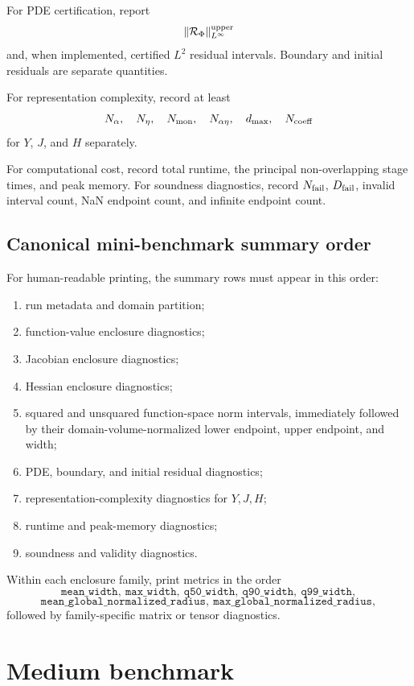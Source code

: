 \documentclass[11pt]{article}
\begin{document}
For PDE certification, report
\[
 \|\mathcal R_\Phi\|_{L^\infty}^{\rm upper}
\]
and, when implemented, certified \(L^2\) residual intervals.  Boundary and
initial residuals are separate quantities.

For representation complexity, record at least
\[
 N_\alpha,\quad N_\eta,\quad N_{\rm mon},\quad
 N_{\alpha\eta},\quad d_{\max},\quad N_{\rm coeff}
\]
for \(Y\), \(J\), and \(H\) separately.

For computational cost, record total runtime, the principal non-overlapping
stage times, and peak memory.  For soundness diagnostics, record
\(N_{\rm fail}\), \(D_{\rm fail}\), invalid interval count, NaN endpoint count,
and infinite endpoint count.

\subsection{Canonical mini-benchmark summary order}

For human-readable printing, the summary rows must appear in this order:
\begin{enumerate}[label=\arabic*.]
 \item run metadata and domain partition;
 \item function-value enclosure diagnostics;
 \item Jacobian enclosure diagnostics;
 \item Hessian enclosure diagnostics;
 \item squared and unsquared function-space norm intervals, immediately
 followed by their domain-volume-normalized lower endpoint, upper endpoint,
 and width;
 \item PDE, boundary, and initial residual diagnostics;
 \item representation-complexity diagnostics for \(Y,J,H\);
 \item runtime and peak-memory diagnostics;
 \item soundness and validity diagnostics.
\end{enumerate}
Within each enclosure family, print metrics in the order
\[
 \texttt{mean\_width},\ \texttt{max\_width},\
 \texttt{q50\_width},\ \texttt{q90\_width},\ \texttt{q99\_width},
\]
\[
 \texttt{mean\_global\_normalized\_radius},\
 \texttt{max\_global\_normalized\_radius},
\]
followed by family-specific matrix or tensor diagnostics.

\section{Medium benchmark}
\end{document}

